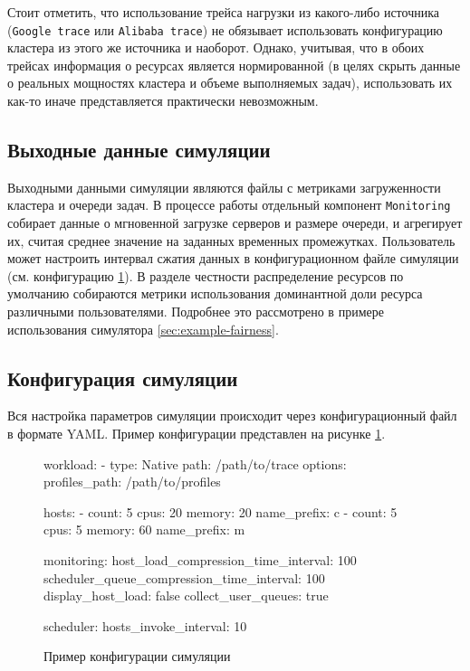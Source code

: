 Стоит отметить, что использование трейса нагрузки из какого-либо источника (\texttt{Google trace} или \texttt{Alibaba trace}) не обязывает использовать конфигурацию кластера из этого же источника и наоборот. Однако, учитывая, что в обоих трейсах информация о ресурсах является нормированной (в целях скрыть данные о реальных мощностях кластера и объеме выполняемых задач), использовать их как-то иначе представляется практически невозможным. 

\subsection{Выходные данные симуляции}\label{sec:output-monitoring}

Выходными данными симуляции являются файлы с метриками загруженности кластера и очереди задач. В процессе работы отдельный компонент \texttt{Monitoring} собирает данные о мгновенной загрузке серверов и размере очереди, и агрегирует их, считая среднее значение на заданных временных промежутках. Пользователь может настроить интервал сжатия данных в конфигурационном файле симуляции (см. конфигурацию \ref{fig:example-sim-config}). В разделе честности распределение ресурсов по умолчанию собираются метрики использования доминантной доли ресурса различными пользователями\cite{drf-article}. Подробнее это рассмотрено в примере использования симулятора \ref{sec:example-fairness}.

\subsection{Конфигурация симуляции}

Вся настройка параметров симуляции происходит через конфигурационный файл в формате YAML. Пример конфигурации представлен на рисунке \ref{fig:example-sim-config}. 

\begin{figure}[h!]
    \footnotesize
    \begin{yamlcode}
                    workload:
                      - type: Native
                        path: /path/to/trace
                        options: 
                          profiles_path: /path/to/profiles
                    
                    hosts: 
                      - count: 5
                        cpus: 20
                        memory: 20
                        name_prefix: c
                      - count: 5
                        cpus: 5
                        memory: 60
                        name_prefix: m
                    
                    monitoring:
                      host_load_compression_time_interval: 100
                      scheduler_queue_compression_time_interval: 100
                      display_host_load: false 
                      collect_user_queues: true
                    
                    scheduler:
                      hosts_invoke_interval: 10
\end{yamlcode}
\caption{Пример конфигурации симуляции}
\label{fig:example-sim-config}
\end{figure}

